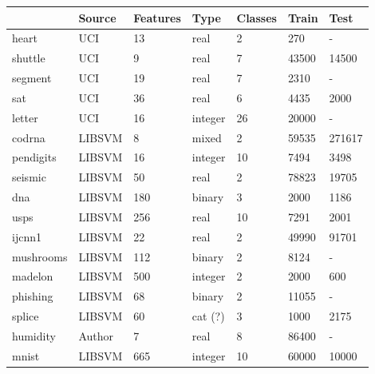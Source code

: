 \begin{tabular}{|l|llllll|}
	\hline
	& Source & Features & Type & Classes & Train & Test \\\hline
	heart & UCI & 13 & real & 2 & 270 & - \\
	shuttle & UCI & 9 & real & 7 & 43500 & 14500 \\
	segment & UCI & 19 & real & 7 & 2310 & - \\
	sat & UCI & 36 & real & 6 & 4435 & 2000 \\
	letter & UCI & 16 & integer & 26 & 20000 & - \\
	codrna & LIBSVM & 8 & mixed & 2 & 59535 & 271617 \\
	pendigits & LIBSVM & 16 & integer & 10 & 7494 & 3498 \\
	seismic & LIBSVM & 50 & real & 2 & 78823 & 19705 \\
	dna & LIBSVM & 180 & binary & 3 & 2000 & 1186 \\
	usps & LIBSVM & 256 & real & 10 & 7291 & 2001 \\
	ijcnn1 & LIBSVM & 22 & real & 2 & 49990 & 91701 \\
	mushrooms & LIBSVM & 112 & binary & 2 & 8124 & - \\
	madelon & LIBSVM & 500 & integer & 2 & 2000 & 600 \\
	phishing & LIBSVM & 68 & binary & 2 & 11055 & - \\
	splice & LIBSVM & 60 & cat (?) & 3 & 1000 & 2175 \\
	humidity & Author & 7 & real & 8 & 86400 & - \\
	mnist & LIBSVM & 665 & integer & 10 & 60000 & 10000 \\
	\hline
\end{tabular}

